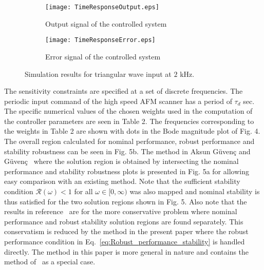 \documentclass[12pt,draftcls,onecolumn]{IEEEtran}
\begin{document}
\begin{figure}
        \centering
        \begin{subfigure}[b]{0.5\textwidth}
                \texttt{[image: TimeResponseOutput.eps]}
                \caption{Output signal of the controlled system}
                \label{fig:gull}
        \end{subfigure}\begin{subfigure}[b]{0.5\textwidth}
                \texttt{[image: TimeResponseError.eps]}
                \caption{Error signal of the controlled system}
                \label{fig:tiger}
        \end{subfigure}
        \caption{Simulation results for triangular wave input at $2$ kHz.}\label{fig:animals}
\end{figure}

The sensitivity constraints are specified at a set of discrete frequencies. The periodic input command of the high speed AFM
scanner has a period of $\tau_{d}$ sec. The specific numerical values of the chosen weights used in the computation of the
controller parameters are seen in Table 2. The frequencies corresponding to the weights in Table 2 are shown with dots in the
Bode magnitude plot of Fig. 4. The overall region calculated for nominal performance, robust performance and stability robustness
can be seen in Fig. 5b. The method in Aksun G\"uven\c{c} and G\"uven\c{c}~\cite{GuG:06} where the solution region is obtained by
intersecting the nominal performance and stability robustness plots is presented in Fig. 5a for allowing easy comparison with an
existing method. Note that the sufficient stability condition $\mathcal{R}(\omega)<1$ for all $\omega\in [0,\infty )$ was also mapped and nominal stability is thus satisfied for the two solution regions shown in Fig. 5. Also note that the results in reference~\cite{GuG:06} are for the more conservative problem where nominal performance and robust stability solution regions are found separately. This conservatism
is reduced by the method in the present paper where the robust performance condition in Eq.~\eqref{eq:Robust_performance_stability} is handled directly. The method in this paper is more general in nature and contains the method of~\cite{GuG:06} as a special case.
\end{document}
